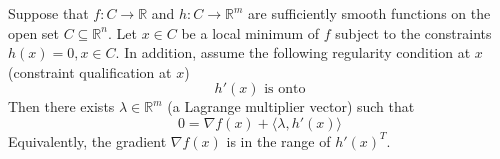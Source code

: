 \begin{theorem}
  Suppose that $f: C \to \mathbb R$ and $h: C \to \mathbb R^m$ are sufficiently smooth functions on the open set $C \subseteq \mathbb R^n$. Let $x \in C$ be a local minimum of $f$ subject to the constraints $h(x) = 0, x \in C$. In addition, assume the following regularity condition at $x$ (constraint qualification at $x$) $$h'(x) \text{ is onto}$$
  Then there exists $\lambda \in \mathbb R^m$ (a Lagrange multiplier vector) such that $$0 = \nabla f(x) + \langle \lambda, h'(x) \rangle$$ Equivalently, the gradient $\nabla f(x)$ is in the range of $h'(x)^T$.
\end{theorem}